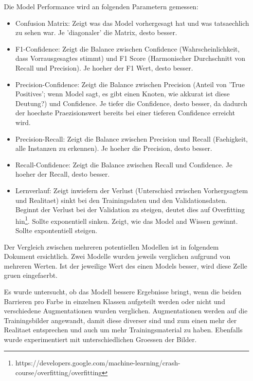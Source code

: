 Die Model Performance wird an folgenden Parametern gemessen:\cite{model-performance}

\begin{itemize}
    \item Confusion Matrix: Zeigt was das Model vorhergesagt hat und was tatsaechlich zu sehen war. Je 'diagonaler' die Matrix, desto besser.
    \item F1-Confidence: Zeigt die Balance zwischen Confidence (Wahrscheinlichkeit, dass Vorrausgesagtes stimmt) und F1 Score (Harmonischer Durchschnitt von Recall und Precision). Je hoeher der F1 Wert, desto besser.
    \item Precision-Confidence: Zeigt die Balance zwischen Precision (Anteil von 'True Positives'; wenn Model sagt, es gibt einen Knoten, wie akkurat ist diese Deutung?) und Confidence. Je tiefer die Confidence, desto besser, da dadurch der hoechste Praezisionswert bereits bei einer tieferen Confidence erreicht wird.
    \item Precision-Recall: Zeigt die Balance zwischen Precision und Recall (Faehigkeit, alle Instanzen zu erkennen). Je hoeher die Precision, desto besser.
    \item Recall-Confidence: Zeigt die Balance zwischen Recall und Confidence. Je hoeher der Recall, desto besser.
    \item Lernverlauf: Zeigt inwiefern der Verlust (Unterschied zwischen Vorhergsagtem und Realitaet) sinkt bei den Trainingsdaten und den Validationsdaten. Beginnt der Verlust bei der Validation zu steigen, deutet dies auf Overfitting hin\footnote{https://developers.google.com/machine-learning/crash-course/overfitting/overfitting}. Sollte exponentiell sinken. Zeigt, wie das Model and Wissen gewinnt. Sollte expontentiell steigen.
\end{itemize}


Der Vergleich zwischen mehreren potentiellen Modellen ist in folgendem Dokument ersichtlich. Zwei Modelle wurden jeweils verglichen aufgrund von mehreren Werten. Ist der jeweilige Wert des einen Models besser, wird diese Zelle gruen eingefaerbt.

Es wurde untersucht, ob das Modell bessere Ergebnisse bringt, wenn die beiden Barrieren pro Farbe in einzelnen Klassen aufgeteilt werden oder nicht und verschiedene Augmentationen wurden verglichen. Augmentationen werden auf die Trainingsbilder angewandt, damit diese diverser sind und zum einen mehr der Realitaet entsprechen und auch um mehr Trainingsmaterial zu haben. Ebenfalls wurde experimentiert mit unterschiedlichen Groessen der Bilder. 


